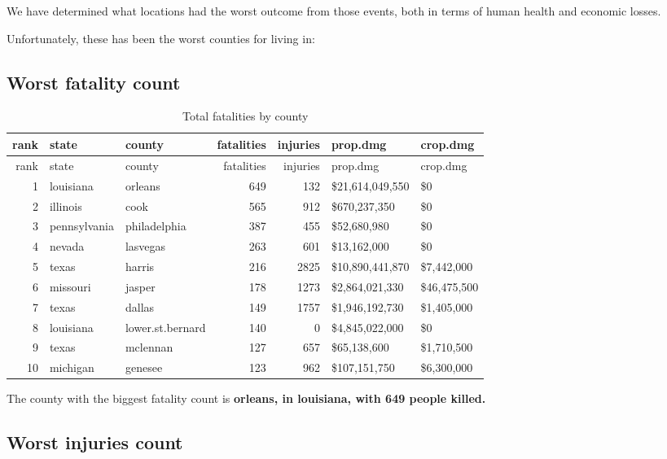 \documentclass[]{article}
\begin{document}
We have determined what locations had the worst outcome from those
events, both in terms of human health and economic losses.

Unfortunately, these has been the worst counties for living in:

\subsection{Worst fatality count}\label{worst-fatality-count}

\begin{longtable}[]{@{}rllrrll@{}}
\caption{Total fatalities by county}\tabularnewline
\toprule
rank & state & county & fatalities & injuries & prop.dmg &
crop.dmg\tabularnewline
\midrule
\endfirsthead
\toprule
rank & state & county & fatalities & injuries & prop.dmg &
crop.dmg\tabularnewline
\midrule
\endhead
1 & louisiana & orleans & 649 & 132 & \$21,614,049,550 &
\$0\tabularnewline
2 & illinois & cook & 565 & 912 & \$670,237,350 & \$0\tabularnewline
3 & pennsylvania & philadelphia & 387 & 455 & \$52,680,980 &
\$0\tabularnewline
4 & nevada & lasvegas & 263 & 601 & \$13,162,000 & \$0\tabularnewline
5 & texas & harris & 216 & 2825 & \$10,890,441,870 &
\$7,442,000\tabularnewline
6 & missouri & jasper & 178 & 1273 & \$2,864,021,330 &
\$46,475,500\tabularnewline
7 & texas & dallas & 149 & 1757 & \$1,946,192,730 &
\$1,405,000\tabularnewline
8 & louisiana & lower.st.bernard & 140 & 0 & \$4,845,022,000 &
\$0\tabularnewline
9 & texas & mclennan & 127 & 657 & \$65,138,600 &
\$1,710,500\tabularnewline
10 & michigan & genesee & 123 & 962 & \$107,151,750 &
\$6,300,000\tabularnewline
\bottomrule
\end{longtable}

The county with the biggest fatality count is \textbf{orleans, in
louisiana, with 649 people killed.}

\newpage

\subsection{Worst injuries count}\label{worst-injuries-count}
\end{document}
